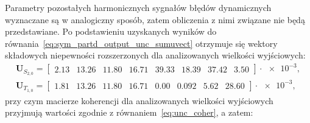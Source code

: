 Parametry pozostałych harmonicznych sygnałów błędów dynamicznych wyznaczane są w analogiczny sposób, zatem obliczenia z nimi związane nie będą przedstawiane. Po podstawieniu uzyskanych wyników do równania~\eqref{eq:sym_partd_output_unc_sumuvect} otrzymuje się wektory składowych niepewności rozszerzonych dla analizowanych wielkości wyjściowych:
\begin{gather}
\mathbf{U}_{S_{2,0}} =
\begin{bmatrix}
2.13 & 13.26 & 11.80 & 16.71 & 39.33 & 18.39 & 37.42 & 3.50
\end{bmatrix} \cdot \num{e-3}
\label{eq:sym_partd_output_unc_sumuvect_S_2_0_b}, \\
\mathbf{U}_{T_{1,0}} =
\begin{bmatrix}
1.81 & 13.26 & 11.80 & 16.71 & 0.00 & 0.092 & 5.62 & 28.60
\end{bmatrix} \cdot \num{e-3}
\label{eq:sym_partd_output_unc_sumuvect_T_1_0_b},
\end{gather}
przy czym macierze koherencji dla analizowanych wielkości wyjściowych przyjmują wartości zgodnie z równaniem~\eqref{eq:unc_coher}, a zatem:
